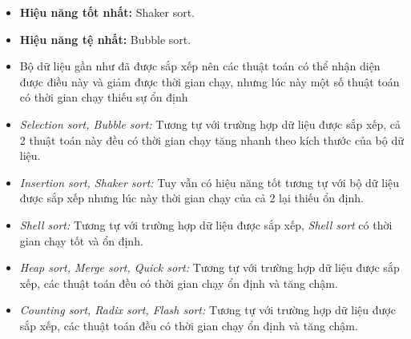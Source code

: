         \begin{itemize}
            \item \textbf{Hiệu năng tốt nhất:} Shaker sort.
            \item \textbf{Hiệu năng tệ nhất:} Bubble sort.
            \item Bộ dữ liệu gần như đã được sắp xếp nên các thuật toán có thể nhận diện được điều này và giảm được thời gian chạy, nhưng lúc này một số thuật toán có thời gian chạy thiếu sự ổn định
            \item \textit{Selection sort, Bubble sort: } Tương tự với trường hợp dữ liệu được sắp xếp, cả 2 thuật toán này đều có thời gian chạy tăng nhanh theo kích thước của bộ dữ liệu.
            \item \textit{Insertion sort, Shaker sort: } Tuy vẫn có hiệu năng tốt tương tự với bộ dữ liệu được sắp xếp nhưng lúc này thời gian chạy của cả 2 lại thiếu ổn định.
            \item \textit{Shell sort: } Tương tự với trường hợp dữ liệu được sắp xếp, \textit{Shell sort} có thời gian chạy tốt và ổn định.
            \item \textit{Heap sort, Merge sort, Quick sort:} Tương tự với trường hợp dữ liệu được sắp xếp, các thuật toán đều có thời gian chạy ổn định và tăng chậm.
            \item \textit{Counting sort, Radix sort, Flash sort:} Tương tự với trường hợp dữ liệu được sắp xếp, các thuật toán đều có thời gian chạy ổn định và tăng chậm.
    \end{itemize}
\newpage
